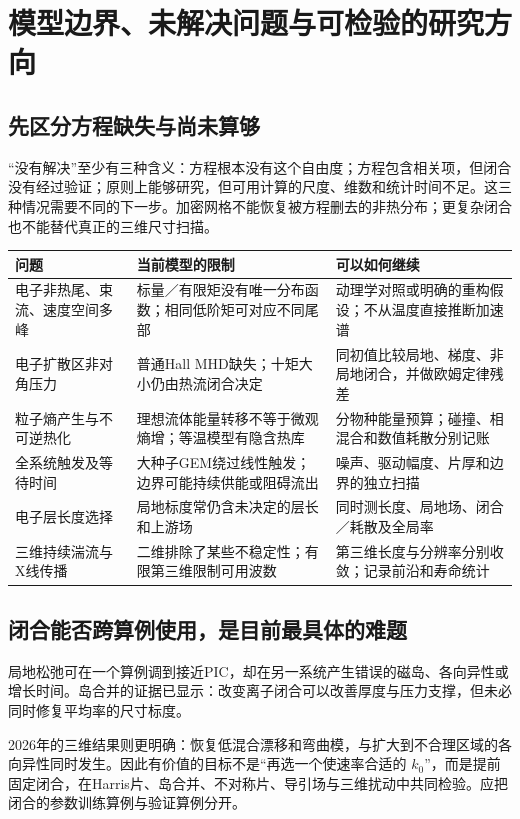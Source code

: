 \chapter{模型边界、未解决问题与可检验的研究方向}
\section{先区分方程缺失与尚未算够}
“没有解决”至少有三种含义：方程根本没有这个自由度；方程包含相关项，但闭合没有经过验证；原则上能够研究，但可用计算的尺度、维数和统计时间不足。这三种情况需要不同的下一步。加密网格不能恢复被方程删去的非热分布；更复杂闭合也不能替代真正的三维尺寸扫描。

\begin{longtable}{P{35mm}P{57mm}P{56mm}}
\toprule 问题 & 当前模型的限制 & 可以如何继续\\\midrule
电子非热尾、束流、速度空间多峰 & 标量／有限矩没有唯一分布函数；相同低阶矩可对应不同尾部 & 动理学对照或明确的重构假设；不从温度直接推断加速谱\\
电子扩散区非对角压力 & 普通Hall MHD缺失；十矩大小仍由热流闭合决定 & 同初值比较局地、梯度、非局地闭合，并做欧姆定律残差\\
粒子熵产生与不可逆热化 & 理想流体能量转移不等于微观熵增；等温模型有隐含热库 & 分物种能量预算；碰撞、相混合和数值耗散分别记账\\
全系统触发及等待时间 & 大种子GEM绕过线性触发；边界可能持续供能或阻碍流出 & 噪声、驱动幅度、片厚和边界的独立扫描\\
电子层长度选择 & 局地标度常仍含未决定的层长和上游场 & 同时测长度、局地场、闭合／耗散及全局率\\
三维持续湍流与X线传播 & 二维排除了某些不稳定性；有限第三维限制可用波数 & 第三维长度与分辨率分别收敛；记录前沿和寿命统计\\\bottomrule
\end{longtable}

\section{闭合能否跨算例使用，是目前最具体的难题}
局地松弛可在一个算例调到接近PIC，却在另一系统产生错误的磁岛、各向异性或增长时间。岛合并的证据已显示：改变离子闭合可以改善厚度与压力支撑，但未必同时修复平均率的尺寸标度。\citep{Ng2015,Ng2017,Ng2020}

2026年的三维结果则更明确：恢复低混合漂移和弯曲模，与扩大到不合理区域的各向异性同时发生。\citep{Closure2026}因此有价值的目标不是“再选一个使速率合适的 $k_0$”，而是提前固定闭合，在Harris片、岛合并、不对称片、导引场与三维扰动中共同检验。应把闭合的参数训练算例与验证算例分开。

